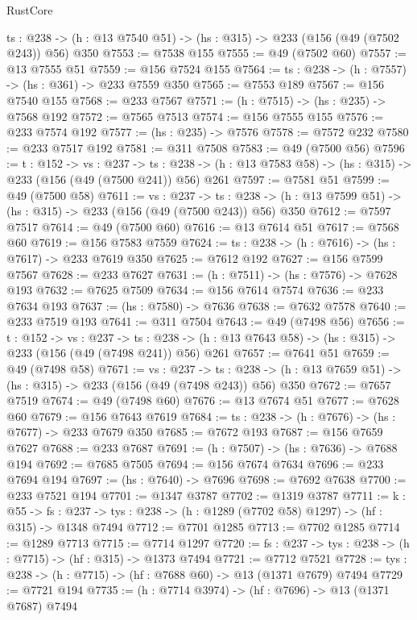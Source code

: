 \begin{lexlean}{RustCore}
\begin{coremodule}
  {ts : @238} -> (h : @13 @7540 @51) -> (hs : @315) -> @233 (@156 (@49 (@7502 @243)) @56) @350
@7553 := @7538 @155
@7555 := @49 (@7502 @60)
@7557 := @13 @7555 @51
@7559 := @156 @7524 @155
@7564 := {ts : @238} -> (h : @7557) -> (hs : @361) -> @233 @7559 @350
@7565 := @7553 @189
@7567 := @156 @7540 @155
@7568 := @233 @7567
@7571 := (h : @7515) -> (hs : @235) -> @7568 @192
@7572 := @7565 @7513
@7574 := @156 @7555 @155
@7576 := @233 @7574 @192
@7577 := (hs : @235) -> @7576
@7578 := @7572 @232
@7580 := @233 @7517 @192
@7581 := @311 @7508
@7583 := @49 (@7500 @56)
@7596 := {t : @152} ->
  {vs : @237} ->
  {ts : @238} -> (h : @13 @7583 @58) -> (hs : @315) -> @233 (@156 (@49 (@7500 @241)) @56) @261
@7597 := @7581 @51
@7599 := @49 (@7500 @58)
@7611 := {vs : @237} ->
  {ts : @238} -> (h : @13 @7599 @51) -> (hs : @315) -> @233 (@156 (@49 (@7500 @243)) @56) @350
@7612 := @7597 @7517
@7614 := @49 (@7500 @60)
@7616 := @13 @7614 @51
@7617 := @7568 @60
@7619 := @156 @7583 @7559
@7624 := {ts : @238} -> (h : @7616) -> (hs : @7617) -> @233 @7619 @350
@7625 := @7612 @192
@7627 := @156 @7599 @7567
@7628 := @233 @7627
@7631 := (h : @7511) -> (hs : @7576) -> @7628 @193
@7632 := @7625 @7509
@7634 := @156 @7614 @7574
@7636 := @233 @7634 @193
@7637 := (hs : @7580) -> @7636
@7638 := @7632 @7578
@7640 := @233 @7519 @193
@7641 := @311 @7504
@7643 := @49 (@7498 @56)
@7656 := {t : @152} ->
  {vs : @237} ->
  {ts : @238} -> (h : @13 @7643 @58) -> (hs : @315) -> @233 (@156 (@49 (@7498 @241)) @56) @261
@7657 := @7641 @51
@7659 := @49 (@7498 @58)
@7671 := {vs : @237} ->
  {ts : @238} -> (h : @13 @7659 @51) -> (hs : @315) -> @233 (@156 (@49 (@7498 @243)) @56) @350
@7672 := @7657 @7519
@7674 := @49 (@7498 @60)
@7676 := @13 @7674 @51
@7677 := @7628 @60
@7679 := @156 @7643 @7619
@7684 := {ts : @238} -> (h : @7676) -> (hs : @7677) -> @233 @7679 @350
@7685 := @7672 @193
@7687 := @156 @7659 @7627
@7688 := @233 @7687
@7691 := (h : @7507) -> (hs : @7636) -> @7688 @194
@7692 := @7685 @7505
@7694 := @156 @7674 @7634
@7696 := @233 @7694 @194
@7697 := (hs : @7640) -> @7696
@7698 := @7692 @7638
@7700 := @233 @7521 @194
@7701 := @1347 @3787
@7702 := @1319 @3787
@7711 := {k : @55} ->
  {fs : @237} -> {tys : @238} -> (h : @1289 (@7702 @58) @1297) -> (hf : @315) -> @1348 @7494
@7712 := @7701 @1285
@7713 := @7702 @1285
@7714 := @1289 @7713
@7715 := @7714 @1297
@7720 := {fs : @237} -> {tys : @238} -> (h : @7715) -> (hf : @315) -> @1373 @7494
@7721 := @7712 @7521
@7728 := {tys : @238} -> (h : @7715) -> (hf : @7688 @60) -> @13 (@1371 @7679) @7494
@7729 := @7721 @194
@7735 := (h : @7714 @3974) -> (hf : @7696) -> @13 (@1371 @7687) @7494

\end{coremodule}
\end{lexlean}
